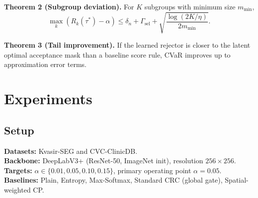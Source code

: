 \documentclass{article}
\begin{document}
\textbf{Theorem 2 (Subgroup deviation).}
For $K$ subgroups with minimum size $m_{\min}$,
\[
\max_k\!\left(R_k(\tau^*)-\alpha\right)\le
\delta_n+\Gamma_{\mathrm{sel}}+\sqrt{\frac{\log(2K/\eta)}{2m_{\min}}}.
\]

\textbf{Theorem 3 (Tail improvement).}
If the learned rejector is closer to the latent optimal acceptance mask than a baseline score rule, CVaR improves up to approximation error terms.

\section{Experiments}
\subsection{Setup}
\textbf{Datasets:} Kvasir-SEG and CVC-ClinicDB.\\
\textbf{Backbone:} DeepLabV3+ (ResNet-50, ImageNet init), resolution $256\times256$.\\
\textbf{Targets:} $\alpha\in\{0.01,0.05,0.10,0.15\}$, primary operating point $\alpha=0.05$.\\
\textbf{Baselines:} Plain, Entropy, Max-Softmax, Standard CRC (global gate), Spatial-weighted CP.
\end{document}
